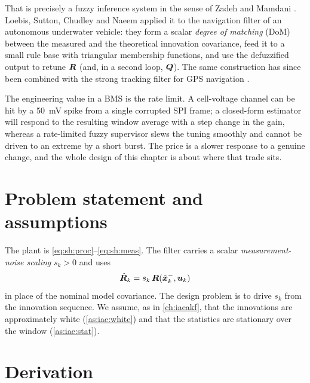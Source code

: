 That is precisely a fuzzy inference system in the sense of Zadeh \cite{zadeh1965} and Mamdani
\cite{mamdani1975}.  Loebis, Sutton, Chudley and Naeem \cite{loebis2004fuzzy} applied it to the
navigation filter of an autonomous underwater vehicle: they form a scalar \emph{degree of matching}
(DoM) between the measured and the theoretical innovation covariance, feed it to a small rule base
with triangular membership functions, and use the defuzzified output to retune $\bm{R}$ (and, in a
second loop, $\bm{Q}$).  The same construction has since been combined with the strong tracking filter
for GPS navigation \cite{jwo2007fuzzy}.

The engineering value in a BMS is the rate limit.  A cell-voltage channel can be hit by a
\SI{50}{\milli\volt} spike from a single corrupted SPI frame; a closed-form estimator will respond
to the resulting window average with a step change in the gain, whereas a rate-limited fuzzy
supervisor slews the tuning smoothly and cannot be driven to an extreme by a short burst.  The price
is a slower response to a genuine change, and the whole design of this chapter is about where that
trade sits.

\section{Problem statement and assumptions}
The plant is \eqref{eq:sh:proc}--\eqref{eq:sh:meas}.  The filter carries a scalar
\emph{measurement-noise scaling} $s_k>0$ and uses
\begin{equation}
\hat{\bm{R}}_k = s_k\,\bm{R}(\hat{\bm{x}}^{-}_k,\bm{u}_k)
\label{eq:fz:R}
\end{equation}
in place of the nominal model covariance.  The design problem is to drive $s_k$ from the innovation
sequence.  We assume, as in \cref{ch:iaeakf}, that the innovations are approximately white
(\cref{as:iae:white}) and that the statistics are stationary over the window
(\cref{as:iae:stat}).

\section{Derivation}

